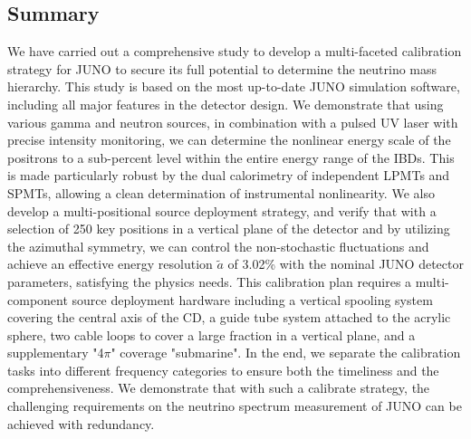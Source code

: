 \documentclass[a4paper,10pt,twoside]{cpc-hepnp}
\begin{document}
\begin{CJK*}{GB}{gbsn}
\begin{multicols}{2}
\section{Summary}
\label{sec:summary}
We have carried out a comprehensive study to develop a multi-faceted
calibration strategy for JUNO to secure its full potential to
determine the neutrino mass hierarchy. This study is based on the most
up-to-date JUNO simulation software, including all major features in
the detector design. We demonstrate that using various gamma and
neutron sources, in combination with a pulsed UV laser with precise
intensity monitoring, we can determine the nonlinear energy scale of
the positrons to a sub-percent level within the entire energy range of
the IBDs. This is made particularly robust by the dual calorimetry of
independent LPMTs and SPMTs, allowing a clean determination of
instrumental nonlinearity. We also develop a multi-positional source
deployment strategy, and verify that with a selection of 250 key
positions in a vertical plane of the detector and by utilizing the
azimuthal symmetry, we can control the non-stochastic fluctuations and
achieve an effective energy resolution $\tilde a$ of 3.02\% with the
nominal JUNO detector parameters, satisfying the physics needs. This
calibration plan requires a multi-component source deployment hardware
including a vertical spooling system covering the central axis of the
CD, a guide tube system attached to the acrylic sphere, two cable
loops to cover a large fraction in a vertical plane, and a
supplementary "4$\pi$" coverage "submarine". In the end, we separate
the calibration tasks into different frequency categories to ensure
both the timeliness and the comprehensiveness. We demonstrate that
with such a calibrate strategy, the challenging requirements on the
neutrino spectrum measurement of JUNO can be achieved with redundancy.

\end{multicols}

\vspace{10mm}



%
%




\end{CJK*}
\end{document}
